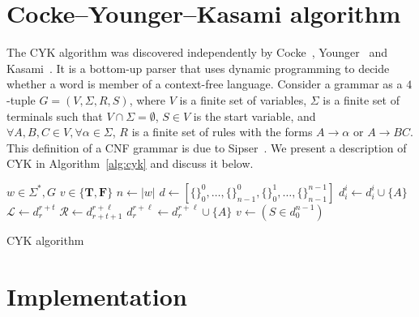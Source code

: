 \documentclass[12pt]{article}
\begin{document}
\section{Cocke–Younger–Kasami algorithm}\label{sec:cyk}

The CYK algorithm was discovered independently by Cocke~\cite{}, Younger~\cite{} and Kasami~\cite{}. It is a bottom-up parser that uses dynamic programming to decide whether a word is member of a context-free language. Consider a grammar as a $4$-tuple $G = (V, \Sigma, R, S)$, where $V$ is a finite set of variables, $\Sigma$ is a finite set of terminals such that $V \cap \Sigma = \emptyset$, $S \in V$ is the start variable, and $\forall A, B, C \in V, \forall \alpha \in \Sigma$, $R$ is a finite set of rules with the forms $A \rightarrow \alpha$ or $A \rightarrow BC$. This definition of a CNF grammar is due to Sipser~\cite{}. We present a description of CYK in Algorithm~\ref{alg:cyk} and discuss it below.

\begin{algorithm}
  \begin{algorithmic}[1]
    \REQUIRE{} $w \in \Sigma^{*}, G$
    \ENSURE{} $v \in \{\mathbf{T}, \mathbf{F}\}$
    \STATE{} $n \leftarrow |w|$
    \STATE{} $d \leftarrow [\{\}_{0}^{0}, \dots, \{\}_{n - 1}^{0}, \{\}_{0}^{1}, \dots, \{\}_{n - 1}^{n - 1}]$
        \STATE{} $d_{i}^{i} \leftarrow d_{i}^{i} \cup \{A\}$
      \ENDIF{}
    \ENDFOR{}
          \STATE{} $\mathcal{L} \leftarrow d_{r}^{r + t}$
          \STATE{} $\mathcal{R} \leftarrow d_{r + t + 1}^{r + \ell}$
              \STATE{} $d_{r}^{r + \ell} \leftarrow d_{r}^{r + \ell} \cup \{A\}$
            \ENDIF{}
          \ENDFOR{}
        \ENDFOR{}
      \ENDFOR{}
    \ENDFOR{}
    \STATE{} $v \leftarrow (S \in d_{0}^{n - 1})$
  \end{algorithmic}
  \caption{CYK algorithm}\label{alg:cyk}
\end{algorithm}

\section{Implementation}\label{sec:imp}



\end{document}
